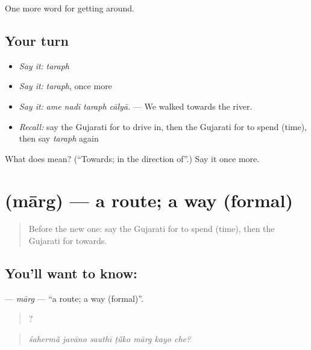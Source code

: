 \begin{grammarlens}[title={What you've built}]
One more word for getting around.
\end{grammarlens}

\subsection*{Your turn}
\begin{itemize}
\raggedright
  \item \emph{Say it:} \emph{taraph}
  \item \emph{Say it:} \emph{taraph}, once more
  \item \emph{Say it:} \emph{ame nadī taraph cālyā.} — We walked towards the river.
  \item \emph{Recall:} say the Gujarati for to drive in, then the Gujarati for to spend (time), then say \emph{taraph} again
\end{itemize}

\begin{tcolorbox}[breakable,colback=teal!4,colframe=teal!35!black,title={Before you move on}]
What does  mean? (\textquotedblleft{}Towards; in the direction of\textquotedblright{}.) Say it once more.
\end{tcolorbox}
\section[\texorpdfstring{\gu{માર્ગ} (mārg)}{માર્ગ (mārg)}]{ (mārg) — a route; a way (formal)}

\label{lesson:GU-C413-marg}



\begin{quote}
Before the new one: say the Gujarati for to spend (time), then the Gujarati for towards.
\end{quote}

\subsection*{You'll want to know: }
\textbf{} — \emph{mārg} — \textquotedblleft{}a route; a way (formal)\textquotedblright{}.

\begin{quote}
      ?
\end{quote}

\begin{quote}
\emph{śahermā̃ javāno sauthī ṭū̃ko mārg kayo che?}
\end{quote}


